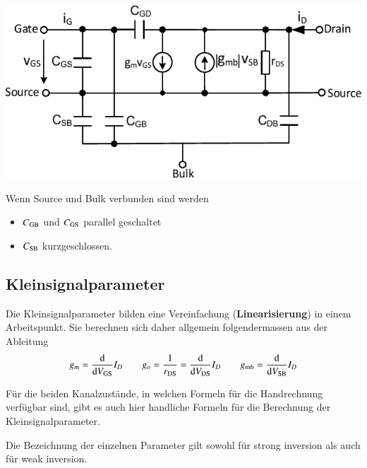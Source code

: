 \begin{minipage}[t]{0.55\columnwidth}
    \includegraphics[width=\columnwidth, align=t]{images/02_MOSFET_Kleinsignalersatzschaltung_hochfrequent_angepasste_Stromrichtung.pdf}
\end{minipage}
\hfill
\begin{minipage}[t]{0.44\columnwidth}
    \raggedright
    Wenn Source und Bulk verbunden sind werden
    \begin{itemize}
        \item $C_{\rm GB}$ und $C_{\rm GS}$ parallel geschaltet
        \item $C_{\rm SB}$ kurzgeschlossen.
    \end{itemize}
\end{minipage}


\subsection{Kleinsignalparameter}
\label{Kleinsignalparameter}

Die Kleinsignalparameter bilden eine Vereinfachung (\textbf{Linearisierung}) in einem Arbeitspunkt. 
Sie berechnen sich daher allgemein folgendermassen aus der Ableitung
\[
    g_m                     = \frac{\mathop{} \! \mathrm{d}}{\mathop{} \! \mathrm{d} V_{\rm GS}} I_D \qquad
    g_o = \frac{1}{r_{\rm DS}}  = \frac{\mathop{} \! \mathrm{d}}{\mathop{} \! \mathrm{d} V_{\rm DS}} I_D \qquad
    g_{\rm mb}                  = \frac{\mathop{} \! \mathrm{d}}{\mathop{} \! \mathrm{d} V_{\rm SB}} I_D
\]

Für die beiden Kanalzustände, in welchen Formeln für die Handrechnung verfügbar sind, gibt es auch hier handliche Formeln für die Berechnung der Kleinsignalparameter.

\smallskip

Die Bezeichnung der einzelnen Parameter gilt sowohl für strong inversion als auch für weak inversion.

